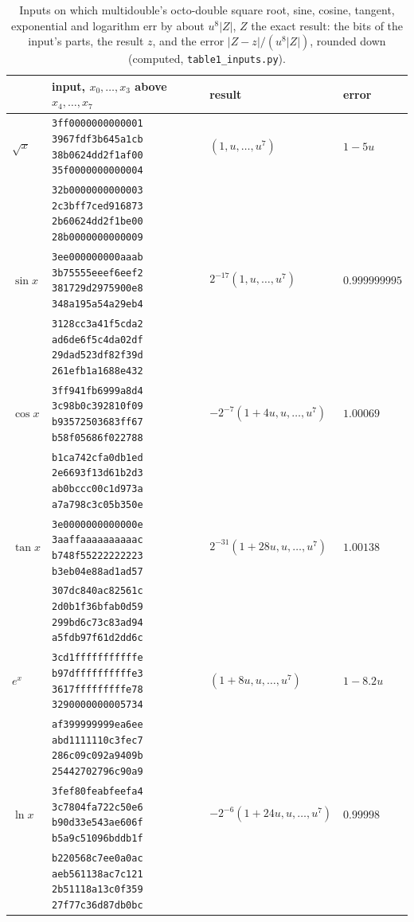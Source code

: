 \begin{table}[tp]
\centering
\caption{Inputs on which multidouble's octo-double square root, sine, cosine, tangent, exponential and logarithm err by
about $u^8|Z|$, $Z$ the exact result: the bits of the input's parts, the result $z$, and the error $|Z - z|/(u^8|Z|)$,
rounded down (computed, \texttt{table1\_inputs.py}).}
\label{tab:inputs}
\footnotesize
\begin{tabular}{@{}llll@{}}
\toprule
& input, $x_0, \dots, x_3$ above $x_4, \dots, x_7$ & result & error \\
\midrule
$\sqrt x$ & \texttt{3ff0000000000001 3967fdf3b645a1cb 38b0624dd2f1af00 35f0000000000004} & $(1, u, \dots, u^7)$ & $1 - 5u$ \\
& \texttt{32b0000000000003 2c3bff7ced916873 2b60624dd2f1be00 28b0000000000009} & & \\ \addlinespace
$\sin x$ & \texttt{3ee000000000aaab 3b75555eeef6eef2 381729d2975900e8 348a195a54a29eb4} & $2^{-17}(1, u, \dots, u^7)$ & $0.999999995$ \\
& \texttt{3128cc3a41f5cda2 ad6de6f5c4da02df 29dad523df82f39d 261efb1a1688e432} & & \\ \addlinespace
$\cos x$ & \texttt{3ff941fb6999a8d4 3c98b0c392810f09 b93572503683ff67 b58f05686f022788} & $-2^{-7}(1 + 4u, u, \dots, u^7)$ & $1.00069$ \\
& \texttt{b1ca742cfa0db1ed 2e6693f13d61b2d3 ab0bccc00c1d973a a7a798c3c05b350e} & & \\ \addlinespace
$\tan x$ & \texttt{3e0000000000000e 3aaffaaaaaaaaaac b748f55222222223 b3eb04e88ad1ad57} & $2^{-31}(1 + 28u, u, \dots, u^7)$ & $1.00138$ \\
& \texttt{307dc840ac82561c 2d0b1f36bfab0d59 299bd6c73c83ad94 a5fdb97f61d2dd6c} & & \\ \addlinespace
$e^x$ & \texttt{3cd1fffffffffffe b97dffffffffffe3 3617fffffffffe78 3290000000005734} & $(1 + 8u, u, \dots, u^7)$ & $1 - 8.2u$ \\
& \texttt{af399999999ea6ee abd1111110c3fec7 286c09c092a9409b 25442702796c90a9} & & \\ \addlinespace
$\ln x$ & \texttt{3fef80feabfeefa4 3c7804fa722c50e6 b90d33e543ae606f b5a9c51096bddb1f} & $-2^{-6}(1 + 24u, u, \dots, u^7)$ & $0.99998$ \\
& \texttt{b220568c7ee0a0ac aeb561138ac7c121 2b51118a13c0f359 27f77c36d87db0bc} & & \\
\bottomrule
\end{tabular}
\end{table}

